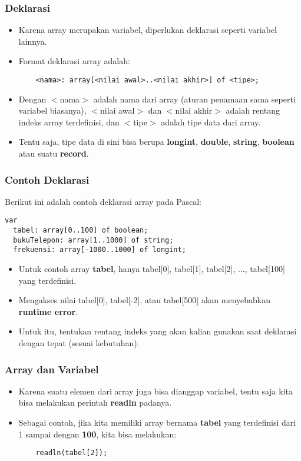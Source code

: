 \documentclass{beamer}
\begin{document}
\begin{frame}[fragile]
\frametitle{Deklarasi}
\begin{itemize}
	\item Karena array merupakan variabel, diperlukan deklarasi seperti variabel lainnya.
	\item Format deklarasi array adalah:
	\begin{lstlisting}
	<nama>: array[<nilai awal>..<nilai akhir>] of <tipe>;
	\end{lstlisting}
	\item Dengan $<$nama$>$ adalah nama dari array (aturan penamaan sama seperti variabel biasanya), $<$nilai awal$>$ dan $<$nilai akhir$>$ adalah rentang indeks array terdefinisi, dan $<$tipe$>$ adalah tipe data dari array.
	\item Tentu saja, tipe data di sini bisa berupa \textbf{longint}, \textbf{double}, \textbf{string}, \textbf{boolean} atau suatu \textbf{record}.
\end{itemize}
\end{frame}

\begin{frame}[fragile]
\frametitle{Contoh Deklarasi}
Berikut ini adalah contoh deklarasi array pada Pascal:
\begin{lstlisting}
var
  tabel: array[0..100] of boolean;
  bukuTelepon: array[1..1000] of string;
  frekuensi: array[-1000..1000] of longint;
\end{lstlisting}
\begin{itemize}
	\item Untuk contoh array \textbf{tabel}, hanya tabel[0], tabel[1], tabel[2], ..., tabel[100] yang terdefinisi.
	\item Mengakses nilai tabel[0], tabel[-2], atau tabel[500] akan menyebabkan \textbf{runtime error}.
	\item Untuk itu, tentukan rentang indeks yang akan kalian gunakan saat deklarasi dengan tepat (sesuai kebutuhan).
\end{itemize}
\end{frame}

\begin{frame}[fragile]
\frametitle{Array dan Variabel}
\begin{itemize}
	\item Karena suatu elemen dari array juga bisa dianggap variabel, tentu saja kita bisa melakukan perintah \textbf{readln} padanya.
	\item Sebagai contoh, jika kita memiliki array bernama \textbf{tabel} yang terdefinisi dari 1 sampai dengan \textbf{100}, kita bisa melakukan:
	\begin{lstlisting}
	readln(tabel[2]);
	\end{lstlisting}
\end{itemize}
\end{frame}
\end{document}
